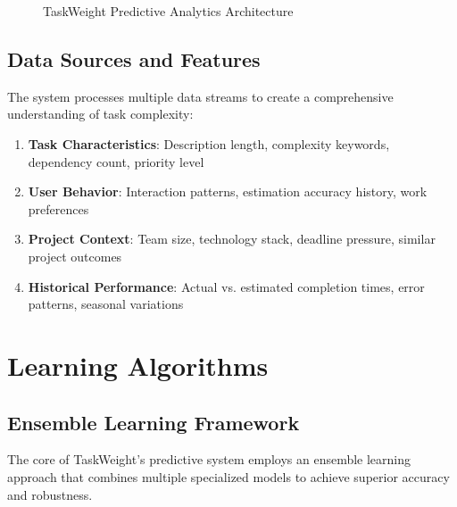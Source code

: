 \documentclass[12pt,a4paper]{article}
\begin{document}
\begin{figure}[H]
\caption{TaskWeight Predictive Analytics Architecture}
\label{fig:ml_architecture}
\end{figure}

\subsection{Data Sources and Features}

The system processes multiple data streams to create a comprehensive understanding of task complexity:

\begin{enumerate}
    \item \textbf{Task Characteristics}: Description length, complexity keywords, dependency count, priority level
    \item \textbf{User Behavior}: Interaction patterns, estimation accuracy history, work preferences
    \item \textbf{Project Context}: Team size, technology stack, deadline pressure, similar project outcomes
    \item \textbf{Historical Performance}: Actual vs. estimated completion times, error patterns, seasonal variations
\end{enumerate}

\section{Learning Algorithms}

\subsection{Ensemble Learning Framework}

The core of TaskWeight's predictive system employs an ensemble learning approach that combines multiple specialized models to achieve superior accuracy and robustness.
\end{document}

